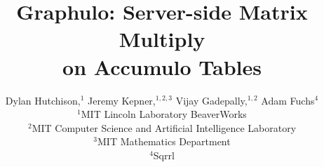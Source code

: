 \documentclass[conference]{IEEEtran}
\begin{document}
\title{Graphulo: Server-side Matrix Multiply\\on Accumulo Tables}



\author[D. Hutchison et al.]
       {Dylan Hutchison,$^1$ Jeremy Kepner,$^{1,2,3}$ Vijay Gadepally,$^{1,2}$ Adam Fuchs$^4$\vspace{6pt}
         \\
         $^1$MIT Lincoln Laboratory BeaverWorks\\
         $^2$MIT Computer Science and Artificial Intelligence Laboratory\\
         $^3$MIT Mathematics Department\\
         $^4$Sqrrl \vspace{-1em}
       }


%
\end{document}
